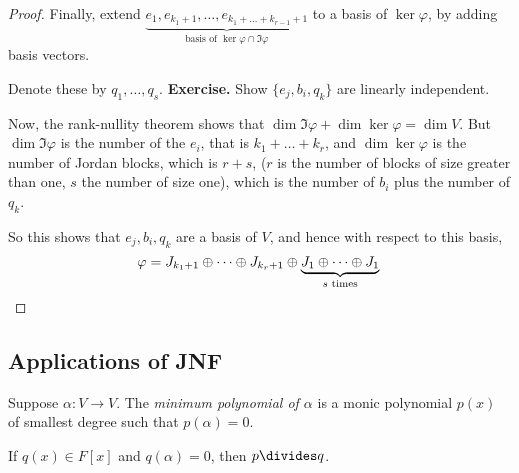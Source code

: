 \begin{proof}
	Finally, extend $\underbrace{e_1,e_{k_1+1},\ldots,e_{k_1+\ldots+k_{r-1}+1}}_\text{basis of $\ker\varphi\cap\Im\varphi$}$ to a basis of $\ker\varphi$, by adding basis vectors. %
	
	Denote these by $q_1,\ldots,q_s$. \textbf{Exercise.} Show $\{e_j,b_i,q_k\}$ are linearly independent. %
	
	Now, the rank-nullity theorem shows that $\dim \Im \varphi + \dim \ker \varphi = \dim V$. But $\dim \Im\varphi $ is the number of the $e_i$, that is $k_1 + \dots + k_r$, and $\dim \ker \varphi$ is the number of Jordan blocks, which is $r + s$, ($r$ is the number of blocks of size greater than one, $s$ the number of size one), which is the number of $b_i$ plus the number of $q_k$. %


	So this shows that $e_j,b_i,q_k$ are a basis of $V$, and hence with respect to this basis, %
	\begin{equation*}
		\varphi = J_{k_1+1} \oplus \cdots \oplus J_{k_r+1} \oplus \underbrace{J_1 \oplus \cdots \oplus J_1}_{s \text{ times}} \qedhere %
	\end{equation*}
\end{proof}


\subsection{Applications of JNF} %
\label{sub:applications_of_jnf}

\begin{definition}
	Suppose $\alpha:V\to V$. The \emph{minimum polynomial of $\alpha$} is a monic polynomial $p(x)$ of smallest degree such that $p(\alpha)=0$. %
\end{definition}

\begin{lemma}
	If $q(x)\in F[x]$ and $q(\alpha)=0$, then $p\divides q$. %
\end{lemma}


